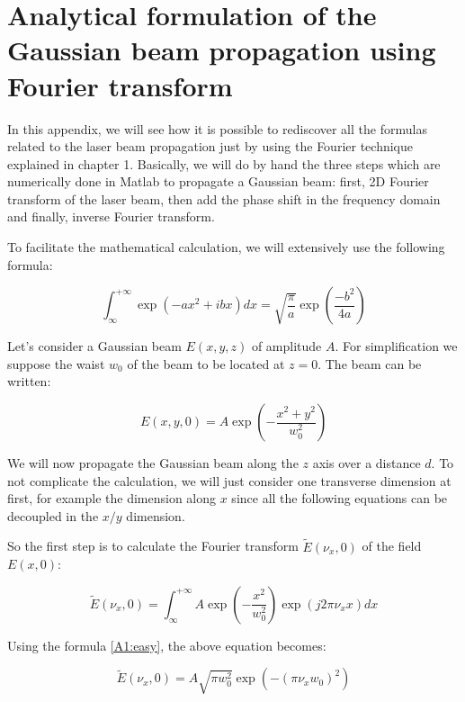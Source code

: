 \chapter{Analytical formulation of the Gaussian beam propagation using Fourier transform}

In this appendix, we will see how it is possible to rediscover all the formulas related to the laser beam propagation just by using the Fourier technique explained in chapter 1. Basically, we will do by hand the three steps which are numerically done in Matlab to propagate a Gaussian beam: first, 2D Fourier transform of the laser beam, then add the phase shift in the frequency domain and finally, inverse Fourier transform.

To facilitate the mathematical calculation, we will extensively use the following formula:

\begin{equation}
 \int^{+\infty}_{\infty} \exp \left( -ax^2 +ibx \right) dx = \sqrt{\frac{\pi}{a}} \exp \left( \frac{-b^2}{4a} \right)
\label{A1:easy}
\end{equation}


Let's consider a Gaussian beam $E(x,y,z)$ of amplitude $A$. For simplification we suppose the waist $w_0$ of the beam to be located at $z = 0$. The beam can be written:

\begin{equation}
    E(x,y,0) = A \exp\left(-\frac{x^2+y^2}{w_0^2}\right)
\end{equation}

We will now propagate the Gaussian beam along the $z$ axis over a distance $d$. To not complicate the calculation, we will just consider one transverse dimension at first, for example the dimension along $x$ since all the following equations can be decoupled in the $x/y$ dimension.

So the first step is to calculate the Fourier transform $\widetilde{E}(\nu_x,0)$ of the field $E(x,0)$:

\begin{equation}
    \widetilde{E}(\nu_x,0) = \int^{+\infty}_{\infty} A \exp\left(-\frac{x^2}{w_0^2}\right) \exp(j2\pi \nu_x x) dx
\end{equation}

Using the formula \ref{A1:easy}, the above equation becomes:

\begin{equation}
    \widetilde{E}(\nu_x,0) = A \sqrt{\pi w_0^2} \exp\left(-(\pi \nu_x w_0)^2 \right)
\end{equation}

